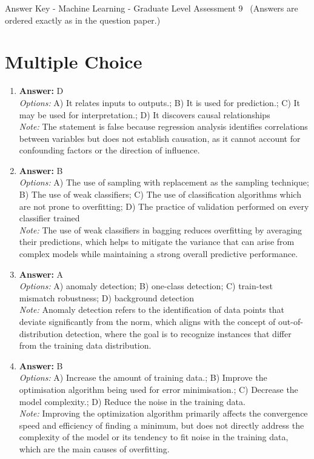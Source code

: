 \documentclass[12pt]{article}
\begin{document}
\begin{center}
Answer Key - Machine Learning - Graduate Level Assessment 9 \
\small (Answers are ordered exactly as in the question paper.)
\end{center}

\section*{Multiple Choice}
\begin{enumerate}[label=\arabic*.]
\item \textbf{Answer:} D
\\ \textit{Options:} A) It relates inputs to outputs.; B) It is used for prediction.; C) It may be used for interpretation.; D) It discovers causal relationships
\\ \textit{Note:} The statement is false because regression analysis identifies correlations between variables but does not establish causation, as it cannot account for confounding factors or the direction of influence.
\item \textbf{Answer:} B
\\ \textit{Options:} A) The use of sampling with replacement as the sampling technique; B) The use of weak classifiers; C) The use of classification algorithms which are not prone to overfitting; D) The practice of validation performed on every classifier trained
\\ \textit{Note:} The use of weak classifiers in bagging reduces overfitting by averaging their predictions, which helps to mitigate the variance that can arise from complex models while maintaining a strong overall predictive performance.
\item \textbf{Answer:} A
\\ \textit{Options:} A) anomaly detection; B) one-class detection; C) train-test mismatch robustness; D) background detection
\\ \textit{Note:} Anomaly detection refers to the identification of data points that deviate significantly from the norm, which aligns with the concept of out-of-distribution detection, where the goal is to recognize instances that differ from the training data distribution.
\item \textbf{Answer:} B
\\ \textit{Options:} A) Increase the amount of training data.; B) Improve the optimisation algorithm being used for error minimisation.; C) Decrease the model complexity.; D) Reduce the noise in the training data.
\\ \textit{Note:} Improving the optimization algorithm primarily affects the convergence speed and efficiency of finding a minimum, but does not directly address the complexity of the model or its tendency to fit noise in the training data, which are the main causes of overfitting.

\end{enumerate}
\end{document}
